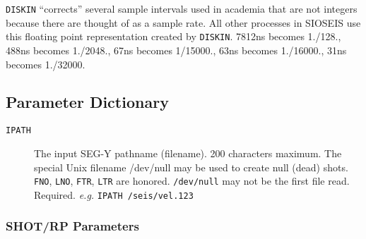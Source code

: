 \texttt{DISKIN} ``corrects'' several sample intervals used in academia that are
not integers because there are thought of as a sample rate.  All other
processes in SIOSEIS use this floating point representation created by
\texttt{DISKIN}.  7812ns becomes 1./128., 488ns becomes 1./2048.,
67ns becomes 1/15000., 63ns becomes 1./16000., 31ns becomes 1./32000.

\subsection{Parameter Dictionary}

\begin{description}
\item[\texttt{IPATH}] The input SEG-Y pathname (filename).  200 characters maximum.
         The special Unix filename {/dev/null} may be used to create
         null (dead) \glspl{shot}.  \texttt{FNO}, \texttt{LNO}, \texttt{FTR}, \texttt{LTR} are honored.  \texttt{/dev/null}
         may not be the first file read.
         Required. \textit{e.g.} \texttt{IPATH /seis/vel.123}
\end{description}

\subsubsection{SHOT/RP Parameters}

